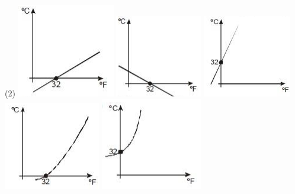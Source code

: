 \documentclass[12pt, a4paper]{article}
\newcommand{\negrito}[1]{\mbox{\boldmath{$#1$}}}
\begin{document}
\begin{tasks}[counter-format={(tsk[a])},label-width=3.6ex, label-format = {\bfseries}, column-sep = {0pt}](2)
\task[\textcolor{Floresta}{$\negrito{(a)} $}] \includegraphics[scale=1.1]{Figuras/14enc2ciclo1.png}
\task[\textcolor{Floresta}{$\negrito{(b)} $}] \includegraphics[scale=1.1]{Figuras/15enc2ciclo1.png}
\task[\textcolor{Floresta}{$\negrito{(c)} $}] \includegraphics[scale=1.03]{Figuras/16enc2ciclo1.png}
\task[\textcolor{Floresta}{$\negrito{(d)} $}] 
\includegraphics[scale=1.1]{Figuras/17enc2ciclo1.png}
\task[\textcolor{Floresta}{$\negrito{(e)} $}] 
\includegraphics[scale=1.1]{Figuras/18enc2ciclo1.png}
\end{tasks}
\end{document}
